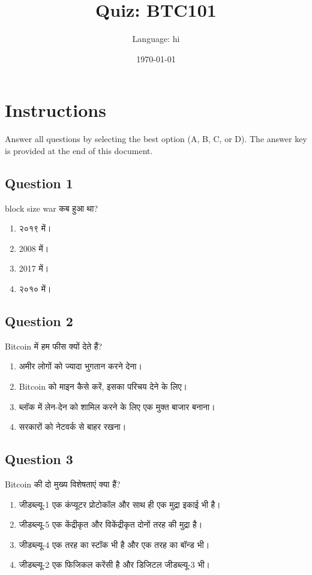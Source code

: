 \documentclass[12pt,a4paper]{article}
\title{Quiz: BTC101}
\author{Language: hi}
\date{\today}
\begin{document}
\maketitle
\thispagestyle{fancy}

\section*{Instructions}
Answer all questions by selecting the best option (A, B, C, or D). The answer key is provided at the end of this document.

\bigskip


\subsection*{Question 1}
block size war कब हुआ था?

\begin{enumerate}[label=\Alph*., leftmargin=*]
\item २०१९ में।
\item 2008 में।
\item 2017 में।
\item २०१० में।
\end{enumerate}

\bigskip


\subsection*{Question 2}
Bitcoin में हम फीस क्यों देते हैं?

\begin{enumerate}[label=\Alph*., leftmargin=*]
\item अमीर लोगों को ज्यादा भुगतान करने देना।
\item Bitcoin को माइन कैसे करें, इसका परिचय देने के लिए।
\item ब्लॉक में लेन-देन को शामिल करने के लिए एक मुक्त बाजार बनाना।
\item सरकारों को नेटवर्क से बाहर रखना।
\end{enumerate}

\bigskip


\subsection*{Question 3}
Bitcoin की दो मुख्य विशेषताएं क्या हैं?

\begin{enumerate}[label=\Alph*., leftmargin=*]
\item जीडब्ल्यू-1 एक कंप्यूटर प्रोटोकॉल और साथ ही एक मुद्रा इकाई भी है।
\item जीडब्ल्यू-5 एक केंद्रीकृत और विकेंद्रीकृत दोनों तरह की मुद्रा है।
\item जीडब्ल्यू-4 एक तरह का स्टॉक भी है और एक तरह का बॉन्ड भी।
\item जीडब्ल्यू-2 एक फिजिकल करेंसी है और डिजिटल जीडब्ल्यू-3 भी।
\end{enumerate}
\end{document}
